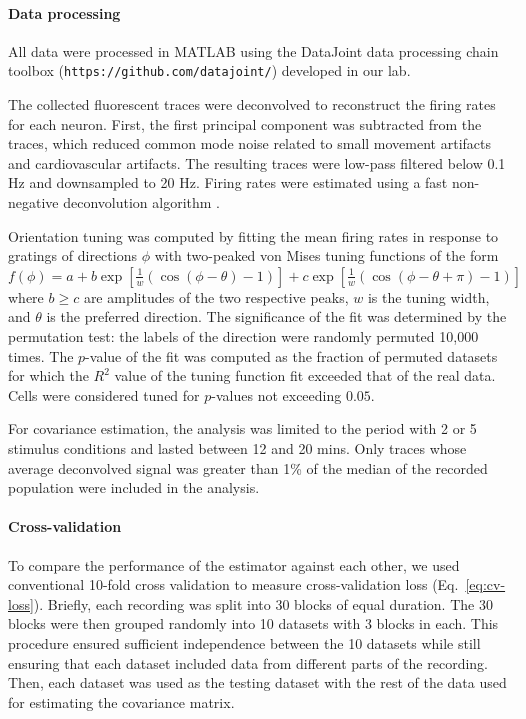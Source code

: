 \documentclass[10pt]{article}
\begin{document}
\paragraph{Data processing}
All data were processed in MATLAB using the DataJoint data processing chain toolbox ({\tt https://github.com/datajoint/}) developed in our lab. 

The collected fluorescent traces were deconvolved to reconstruct the firing rates for each neuron. First, the first principal component was subtracted from the traces, which reduced common mode noise related to small movement artifacts and cardiovascular artifacts. The resulting traces were low-pass filtered below 0.1 Hz and downsampled to 20 Hz. Firing rates were estimated using a fast non-negative deconvolution algorithm \cite{Vogelstein:2010}.

Orientation tuning was computed by fitting the mean firing rates in response to gratings of directions $\phi$ with two-peaked von Mises tuning functions of the form $f(\phi)=a + b\exp\left[\frac 1 w(\cos(\phi-\theta)-1) \right] + c\exp\left[\frac 1 w(\cos(\phi-\theta+\pi)-1) \right]$ where $b\ge c$ are amplitudes of the two respective peaks, $w$ is the tuning width, and  $\theta$ is the preferred direction. The significance of the fit was determined by the permutation test: the labels of the direction were randomly permuted 10,000 times.  The $p$-value of the fit was computed as the fraction of permuted datasets for which the $R^2$ value of the tuning function fit exceeded that of the real data.  Cells were considered tuned for $p$-values not exceeding $0.05$.

For covariance estimation, the analysis was limited to the period with 2 or 5 stimulus conditions and lasted between 12 and 20 mins.  Only traces whose average deconvolved signal was greater than 1\% of the median of the recorded population were included in the analysis.  
\paragraph{Cross-validation}
To compare the performance of the estimator against each other, we used conventional 10-fold cross validation to measure cross-validation loss (Eq.~\ref{eq:cv-loss}). Briefly, each recording was split into 30 blocks of equal duration.  The 30 blocks were then grouped randomly into 10 datasets with 3 blocks in each.  This procedure ensured sufficient independence between the 10 datasets while still ensuring that each dataset included data from different parts of the recording.   Then, each dataset was used as the testing dataset with the rest of the data used for estimating the covariance matrix.  
\end{document}
